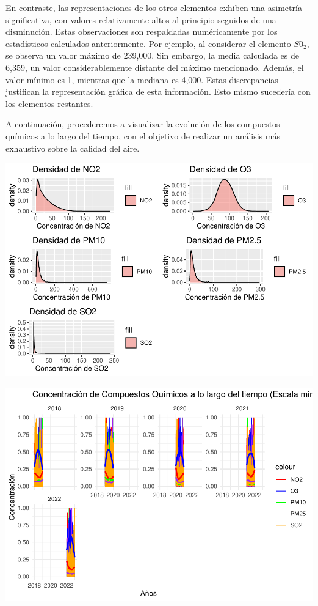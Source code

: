 \documentclass[notspecified,article,submit,moreauthors,pdftex]{Definitions/mdpi}
\begin{document}
En contraste, las representaciones de los otros elementos exhiben una
asimetría significativa, con valores relativamente altos al principio
seguidos de una disminución. Estas observaciones son respaldadas
numéricamente por los estadísticos calculados anteriormente. Por
ejemplo, al considerar el elemento \(S0_{2}\), se observa un valor
máximo de 239,000. Sin embargo, la media calculada es de 6,359, un valor
considerablemente distante del máximo mencionado. Además, el valor
mínimo es 1, mientras que la mediana es 4,000. Estas discrepancias
justifican la representación gráfica de esta información. Esto mismo
sucedería con los elementos restantes.

A continuación, procederemos a visualizar la evolución de los compuestos
químicos a lo largo del tiempo, con el objetivo de realizar un análisis
más exhaustivo sobre la calidad del aire.

\includegraphics{ProyectoAED2023_files/figure-latex/unnamed-chunk-22-1.pdf}

\includegraphics{ProyectoAED2023_files/figure-latex/unnamed-chunk-23-1.pdf}
\end{document}
